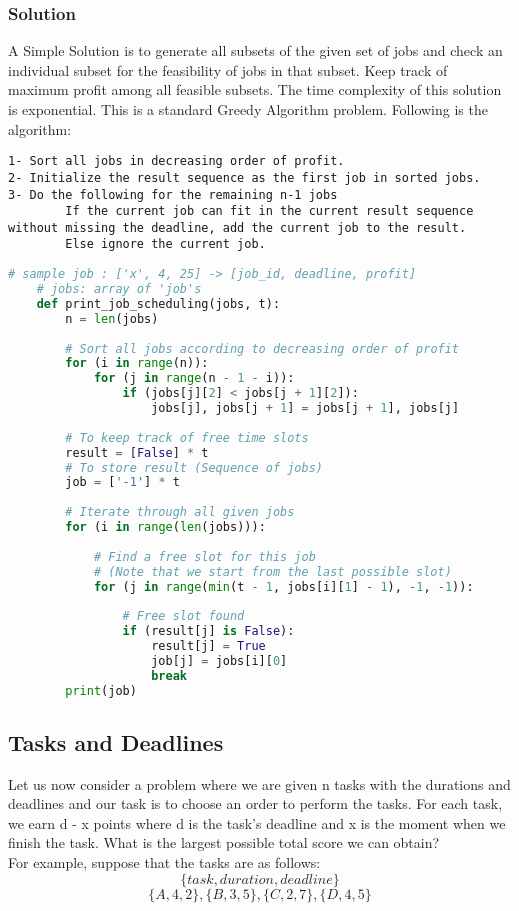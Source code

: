 \documentclass[12pt]{article}
\begin{document}
    \subsubsection{Solution}
    A Simple Solution is to generate all subsets of the given set of jobs and check an individual subset for the feasibility of jobs in that subset. Keep track of maximum profit among all feasible subsets. The time complexity of this solution is exponential.
    This is a standard Greedy Algorithm problem. Following is the algorithm:
	\begin{lstlisting}[numbers=none, frame=none]
1- Sort all jobs in decreasing order of profit.
2- Initialize the result sequence as the first job in sorted jobs.
3- Do the following for the remaining n-1 jobs
        If the current job can fit in the current result sequence without missing the deadline, add the current job to the result.
        Else ignore the current job.
	\end{lstlisting}
	\newpage
	\begin{lstlisting}[language=Python]
	# sample job : ['x', 4, 25] -> [job_id, deadline, profit]
	# jobs: array of 'job's
	def print_job_scheduling(jobs, t): 
        n = len(jobs) 
        
        # Sort all jobs according to decreasing order of profit 
        for (i in range(n)): 
            for (j in range(n - 1 - i)): 
                if (jobs[j][2] < jobs[j + 1][2]): 
                    jobs[j], jobs[j + 1] = jobs[j + 1], jobs[j] 
        
        # To keep track of free time slots 
        result = [False] * t 
        # To store result (Sequence of jobs) 
        job = ['-1'] * t 
        
        # Iterate through all given jobs 
        for (i in range(len(jobs))): 
        
            # Find a free slot for this job  
            # (Note that we start from the last possible slot) 
            for (j in range(min(t - 1, jobs[i][1] - 1), -1, -1)): 
                  
                # Free slot found 
                if (result[j] is False): 
                    result[j] = True
                    job[j] = jobs[i][0] 
                    break
        print(job) 

    \end{lstlisting}
    
    \subsection{Tasks and Deadlines}
    Let us now consider a problem where we are given n tasks with the durations and deadlines and our task is to choose an order to perform the tasks. For each task, we earn d \-- x points where d is the task’s deadline and x is the moment when we finish the task. What is the largest possible total score we can obtain?\\
    For example, suppose that the tasks are as follows:\\
    \[\{task, duration, deadline\}\]
    \[\{A, 4, 2\} , \{B, 3, 5\} , \{C, 2, 7\} , \{D, 4, 5\}\]
    
\end{document}
